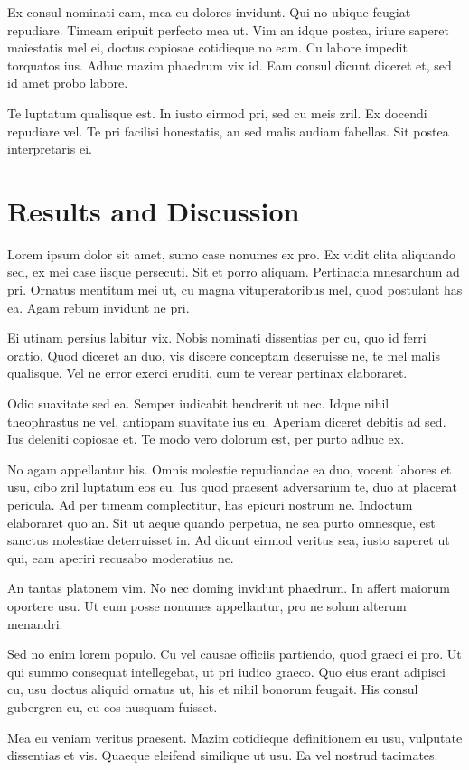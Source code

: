 \documentclass{article}
\begin{document}
Ex consul nominati eam, mea eu dolores invidunt. Qui no ubique feugiat repudiare. Timeam eripuit perfecto mea ut. Vim an idque postea, iriure saperet maiestatis mel ei, doctus copiosae cotidieque no eam. Cu labore impedit torquatos ius. Adhuc mazim phaedrum vix id. Eam consul dicunt diceret et, sed id amet probo labore.

Te luptatum qualisque est. In iusto eirmod pri, sed cu meis zril. Ex docendi repudiare vel. Te pri facilisi honestatis, an sed malis audiam fabellas. Sit postea interpretaris ei.
\section{Results and Discussion}
Lorem ipsum dolor sit amet, sumo case nonumes ex pro. Ex vidit clita aliquando sed, ex mei case iisque persecuti. Sit et porro aliquam. Pertinacia mnesarchum ad pri. Ornatus mentitum mei ut, cu magna vituperatoribus mel, quod postulant has ea. Agam rebum invidunt ne pri.

Ei utinam persius labitur vix. Nobis nominati dissentias per cu, quo id ferri oratio. Quod diceret an duo, vis discere conceptam deseruisse ne, te mel malis qualisque. Vel ne error exerci eruditi, cum te verear pertinax elaboraret.

Odio suavitate sed ea. Semper iudicabit hendrerit ut nec. Idque nihil theophrastus ne vel, antiopam suavitate ius eu. Aperiam diceret debitis ad sed. Ius deleniti copiosae et. Te modo vero dolorum est, per purto adhuc ex.

No agam appellantur his. Omnis molestie repudiandae ea duo, vocent labores et usu, cibo zril luptatum eos eu. Ius quod praesent adversarium te, duo at placerat pericula. Ad per timeam complectitur, has epicuri nostrum ne. Indoctum elaboraret quo an. Sit ut aeque quando perpetua, ne sea purto omnesque, est sanctus molestiae deterruisset in. Ad dicunt eirmod veritus sea, iusto saperet ut qui, eam aperiri recusabo moderatius ne.

An tantas platonem vim. No nec doming invidunt phaedrum. In affert maiorum oportere usu. Ut eum posse nonumes appellantur, pro ne solum alterum menandri.

Sed no enim lorem populo. Cu vel causae officiis partiendo, quod graeci ei pro. Ut qui summo consequat intellegebat, ut pri iudico graeco. Quo eius erant adipisci cu, usu doctus aliquid ornatus ut, his et nihil bonorum feugait. His consul gubergren cu, eu eos nusquam fuisset.

Mea eu veniam veritus praesent. Mazim cotidieque definitionem eu usu, vulputate dissentias et vis. Quaeque eleifend similique ut usu. Ea vel nostrud tacimates.
\end{document}
